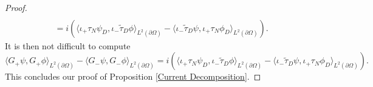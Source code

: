 \documentclass[10pt,a4paper]{amsart}
\begin{document}
\begin{proof}
\begin{equation}
\begin{split}
    \\
    &=i\left( \langle \iota_+ \tau_N \psi_D, \iota_- \tilde{\tau}_D \phi \rangle_{L^2(\partial \Omega)} -\langle  \iota_-\tilde{\tau}_D \psi, \iota_+ \tau_N \phi_D \rangle_{L^2(\partial \Omega)}\right).
    \end{split}
\end{equation}
It is then not difficult to compute
    \begin{equation}
        \langle G_+\psi, G_+ \phi\rangle_{L^2(\partial \Omega)}- \langle G_-\psi, G_- \phi\rangle_{L^2(\partial \Omega)}= i\left( \langle \iota_+ \tau_N \psi_D, \iota_- \tilde{\tau}_D \phi \rangle_{L^2(\partial \Omega)} -\langle  \iota_-\tilde{\tau}_D \psi, \iota_+ \tau_N \phi_D \rangle_{L^2(\partial \Omega)}\right).
    \end{equation}
This concludes our proof of Proposition \ref{Current Decomposition}. \end{proof}
\end{document}
